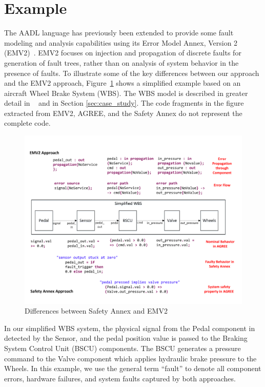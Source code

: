 \section{Example}
\label{sec:comparison_with_EMV2}

The AADL language has previously been extended to provide some fault modeling and analysis capabilities using its Error Model Annex, Version 2 (EMV2)~\cite{EMV2}.  EMV2 focuses on injection and propagation of discrete faults for generation of fault trees, rather than on analysis of system behavior in the presence of faults. 
To illustrate some of the key differences between our approach and the EMV2 approach, Figure~\ref{fig:comparison_with_EMV2} shows a simplified example based on an aircraft Wheel Brake System (WBS). The WBS model is described in greater detail in ~\cite{Stewart17:IMBSA} and in Section \ref{sec:case_study}. The code fragments in the figure extracted from EMV2, AGREE, and the Safety Annex do not represent the complete code.

\begin{figure}[t]
	\vspace{-0.19in}
	\centering
	\includegraphics[trim=0 9 0 5,clip,width=\textwidth]{images/Comparison_with_EMV2.pdf}
	\caption{Differences between Safety Annex and EMV2}
	\label{fig:comparison_with_EMV2}
\end{figure} 


In our simplified WBS system, the physical signal from the Pedal component in detected by the Sensor, and the pedal position value is passed to the Braking System Control Unit (BSCU) components.  The BSCU generates a pressure command to the Valve component which applies hydraulic brake pressure to the Wheels. In this example, we use the general term ``fault'' to denote all component errors, hardware failures, and system faults captured by both approaches.

